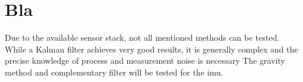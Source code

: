 \section{Bla}
Due to the available sensor stack, not all mentioned methods can be tested.
While a Kalman filter achieves very good results, it is generally complex and the precise knowledge of process and measurement noise is necessary \cite{Higgins1975}
The gravity method and complementary filter will be tested for the \gls{imu}.

